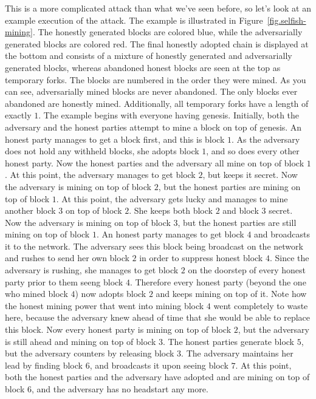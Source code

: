 This is a more complicated attack than what we've seen before, so let's look at an example
execution of the attack. The example is illustrated in Figure~\ref{fig.selfish-mining}. The
honestly generated blocks are colored blue, while the adversarially generated blocks are
colored red. The final honestly adopted chain is displayed at the bottom and consists of a
mixture of honestly generated and adversarially generated blocks, whereas abandoned honest
blocks are seen at the top as temporary forks. The blocks are numbered in the order they were
mined. As you can see, adversarially mined blocks are never abandoned. The only blocks ever
abandoned are honestly mined. Additionally, all temporary forks have a length of exactly $1$.
The example begins with everyone having genesis. Initially, both the adversary and the honest
parties attempt to mine a block on top of genesis. An honest party manages to get a block first,
and this is block $1$. As the adversary does not hold any withheld blocks, she adopts block
$1$, and so does every other honest party. Now the honest parties and the adversary all mine
on top of block $1$. At this point, the adversary manages to get block $2$, but keeps it secret.
Now the adversary is mining on top of block $2$, but the honest parties are mining on top of
block $1$. At this point, the adversary gets lucky and manages to mine another block $3$
on top of block $2$. She keeps both block $2$ and block $3$ secret. Now the adversary is mining
on top of block $3$, but the honest parties are still mining on top of block $1$. An honest
party manages to get block $4$ and broadcasts it to the network. The adversary
sees this block being broadcast on the network and rushes to send her own block $2$ in order to
suppress honest block $4$. Since the adversary is rushing, she manages to get block $2$ on
the doorstep of every honest party prior to them seeng block $4$. Therefore every honest
party (beyond the one who mined block $4$) now adopts block $2$ and keeps mining on top of it.
Note how the honest mining power that went into mining block $4$ went completely to waste
here, because the adversary knew ahead of time that she would be able to replace this block.
Now every honest party is mining on top of block $2$, but the adversary is still ahead and
mining on top of block $3$. The honest parties generate block $5$, but the adversary counters
by releasing block $3$. The adversary maintains her lead by finding block $6$, and broadcasts it upon
seeing block $7$. At this point, both the honest parties and the adversary have adopted and are mining
on top of block $6$, and the adversary has no headstart any more.

